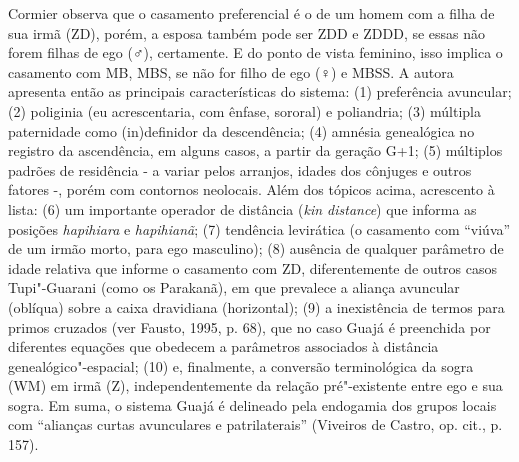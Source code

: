Cormier observa que o casamento preferencial é o de um homem com a filha
de sua irmã (ZD), porém, a esposa também pode ser ZDD e ZDDD, se essas
não forem filhas de ego (♂), certamente. E do ponto de vista feminino,
isso implica o casamento com MB, MBS, se não for filho de ego (♀) e
MBSS. A autora apresenta então as principais características do sistema:
(1) preferência avuncular; (2) poliginia (eu acrescentaria, com ênfase,
sororal) e poliandria; (3) múltipla paternidade como (in)definidor da
descendência; (4) amnésia genealógica no registro da ascendência, em
alguns casos, a partir da geração G+1; (5) múltiplos padrões de
residência - a variar pelos arranjos, idades dos cônjuges e outros
fatores -, porém com contornos neolocais. Além dos tópicos acima,
acrescento à lista: (6) um importante operador de distância (\emph{kin
distance}) que informa as posições \emph{hapihiara} e \emph{hapihianã};
(7) tendência levirática (o casamento com ``viúva'' de um irmão morto,
para ego masculino); (8) ausência de qualquer parâmetro de idade
relativa que informe o casamento com ZD, diferentemente de outros casos
Tupi"-Guarani (como os Parakanã), em que prevalece a aliança avuncular
(oblíqua) sobre a caixa dravidiana (horizontal); (9) a inexistência de
termos para primos cruzados (ver Fausto, 1995, p. 68), que no caso Guajá
é preenchida por diferentes equações que obedecem a parâmetros
associados à distância genealógico"-espacial; (10) e, finalmente, a
conversão terminológica da sogra (WM) em irmã (Z), independentemente da
relação pré"-existente entre ego e sua sogra. Em suma, o sistema Guajá é
delineado pela endogamia dos grupos locais com ``alianças curtas
avunculares e patrilaterais'' (Viveiros de Castro, op. cit., p. 157).

